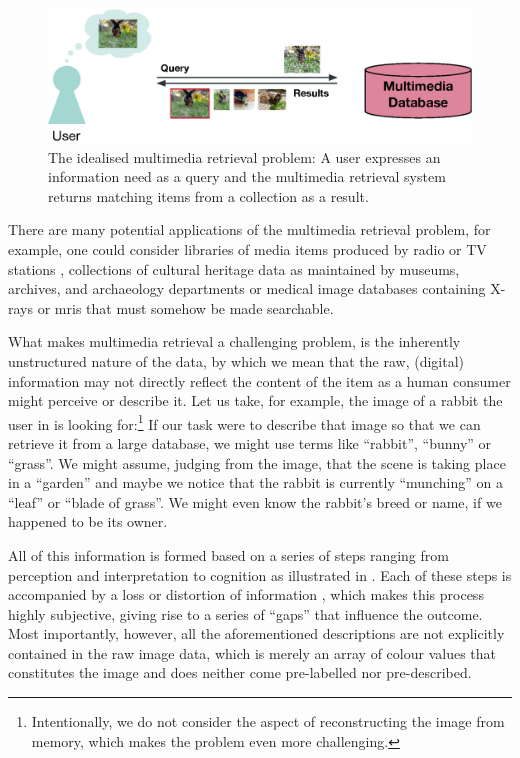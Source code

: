 \begin{figure}[tb]
    \centering
    \includegraphics[width=\textwidth]{figures/mr-ideal.eps}
    \caption{The idealised multimedia retrieval problem: A user expresses an information need as a query and the multimedia retrieval system returns matching items from a collection as a result.}
    \label{figure:mr-ideal}
\end{figure}

There are many potential applications of the multimedia retrieval problem, for example, one could consider libraries of media items produced by radio or TV stations \cite{Watanabe:1998Multimedia}, collections of cultural heritage data as maintained by museums, archives, and archaeology departments \cite{Tsai:2007Review} or medical image databases containing X-rays or \acrshort{mri}s \cite{Mueller:2004Review} that must somehow be made searchable.

What makes multimedia retrieval a challenging problem, is the inherently unstructured nature of the data, by which we mean that the raw, (digital) information may not directly reflect the content of the item as a human consumer might perceive or describe it. Let us take, for example, the image of a rabbit the user in  is looking for:\footnote{Intentionally, we do not consider the aspect of reconstructing the image from memory, which makes the problem even more challenging.} If our task were to describe that image so that we can retrieve it from a large database, we might use terms like ``rabbit'', ``bunny'' or ``grass''. We might assume, judging from the image, that the scene is taking place in a ``garden'' and maybe we notice that the rabbit is currently ``munching'' on a ``leaf'' or ``blade of grass''. We might even know the rabbit's breed or name, if we happened to be its owner.

All of this information is formed based on a series of steps ranging from perception and interpretation to cognition as illustrated in . Each of these steps is accompanied by a loss or distortion of information \cite{Javanmardi:2021Exploring,Rossetto:2018Multi}, which makes this process highly subjective, giving rise to a series of ``gaps'' that influence the outcome. Most importantly, however, all the aforementioned descriptions are not explicitly contained in the raw image data, which is merely an array of colour values that constitutes the image and does neither come pre-labelled nor pre-described.

